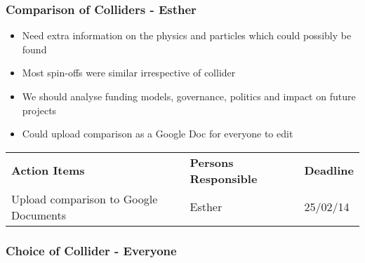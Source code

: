 \subsubsection{Comparison of Colliders - Esther}

\begin{itemize}
\item Need extra information on the physics and particles which could possibly be found
\item  Most spin-offs were similar irrespective of collider
\item  We should analyse funding models, governance, politics and impact on future projects
\item  Could upload comparison as a Google Doc for everyone to edit
\end{itemize}

\begin{tabularx}{\textwidth}{X p{4.5cm} p{1.2cm}}
  \textbf{Action Items} & \textbf{Persons Responsible} & \textbf{Deadline} \\

Upload comparison to Google Documents
& Esther &
25/02/14 \\

\end{tabularx}


\subsubsection{Choice of Collider - Everyone}

